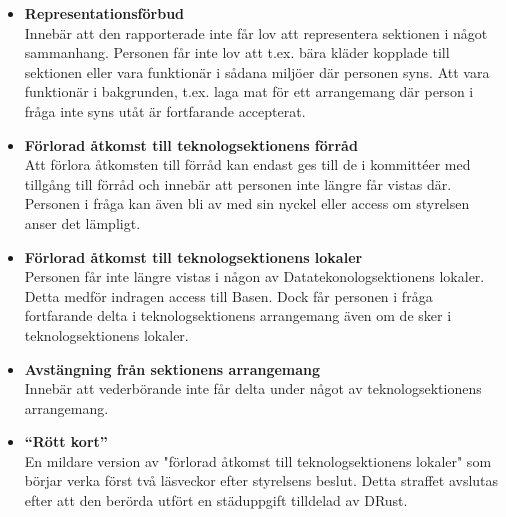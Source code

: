 \begin{itemize}
    \item \textbf{Representationsförbud}\\
    Innebär att den rapporterade inte får lov att representera sektionen i något sammanhang. Personen får inte lov att t.ex. bära kläder kopplade till sektionen eller vara funktionär i sådana miljöer där personen syns. Att vara funktionär i bakgrunden, t.ex. laga mat för ett arrangemang där person i fråga inte syns utåt är fortfarande accepterat.
    \item \textbf{Förlorad åtkomst till teknologsektionens förråd}\\
    Att förlora åtkomsten till förråd kan endast ges till de i kommittéer med tillgång till förråd och innebär att personen inte längre får vistas där. Personen i fråga kan även bli av med sin nyckel eller access om styrelsen anser det lämpligt.
    \item \textbf{Förlorad åtkomst till teknologsektionens lokaler}\\
    Personen får inte längre vistas i någon av Datatekonologsektionens lokaler. Detta medför indragen access till Basen. Dock får personen i fråga fortfarande delta i teknologsektionens arrangemang även om de sker i teknologsektionens lokaler. 
    \item \textbf{Avstängning från sektionens arrangemang}\\
    Innebär att vederbörande inte får delta under något av teknologsektionens arrangemang.
    \item \textbf{``Rött kort''}\\
    En mildare version av "förlorad åtkomst till teknologsektionens lokaler" som börjar verka först två läsveckor efter styrelsens beslut. Detta straffet avslutas efter att den berörda utfört en städuppgift tilldelad av DRust.
\end{itemize}


